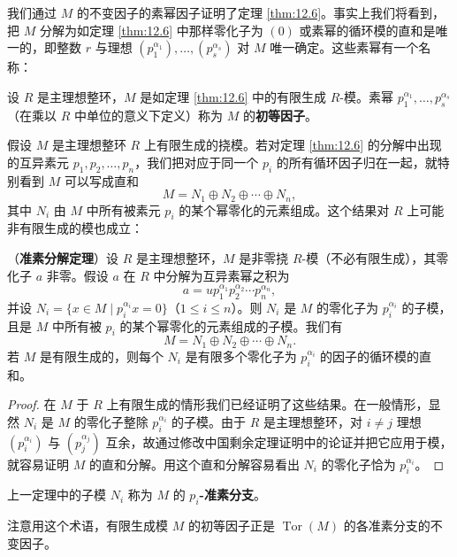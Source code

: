 我们通过 \(M\) 的不变因子的素幂因子证明了定理 \ref{thm:12.6}。事实上我们将看到，把 \(M\) 分解为如定理 \ref{thm:12.6} 中那样零化子为 \((0)\) 或素幂的循环模的直和是唯一的，即整数 \(r\) 与理想 \((p_1^{\alpha_1}), \ldots, (p_s^{\alpha_s})\) 对 \(M\) 唯一确定。这些素幂有一个名称：

\begin{definition}
设 \(R\) 是主理想整环，\(M\) 是如定理 \ref{thm:12.6} 中的有限生成 \(R\)-模。素幂 \(p_1^{\alpha_1}, \ldots, p_s^{\alpha_s}\)（在乘以 \(R\) 中单位的意义下定义）称为 \(M\) 的\textbf{初等因子}。
\end{definition}

假设 \(M\) 是主理想整环 \(R\) 上有限生成的挠模。若对定理 \ref{thm:12.6} 的分解中出现的互异素元 \(p_1, p_2, \ldots, p_n\)，我们把对应于同一个 \(p_i\) 的所有循环因子归在一起，就特别看到 \(M\) 可以写成直和
\[
M = N_1 \oplus N_2 \oplus \cdots \oplus N_n,
\]
其中 \(N_i\) 由 \(M\) 中所有被素元 \(p_i\) 的某个幂零化的元素组成。这个结果对 \(R\) 上可能非有限生成的模也成立：

\begin{theorem}\label{thm:12.7}
（\textbf{准素分解定理}）设 \(R\) 是主理想整环，\(M\) 是非零挠 \(R\)-模（不必有限生成），其零化子 \(a\) 非零。假设 \(a\) 在 \(R\) 中分解为互异素幂之积为
\[
a = up_1^{\alpha_1}p_2^{\alpha_2}\cdots p_n^{\alpha_n},
\]
并设 \(N_i = \{x \in M \mid p_i^{\alpha_i}x = 0\}\)（\(1 \leq i \leq n\)）。则 \(N_i\) 是 \(M\) 的零化子为 \(p_i^{\alpha_i}\) 的子模，且是 \(M\) 中所有被 \(p_i\) 的某个幂零化的元素组成的子模。我们有
\[
M = N_1 \oplus N_2 \oplus \cdots \oplus N_n.
\]
若 \(M\) 是有限生成的，则每个 \(N_i\) 是有限多个零化子为 \(p_i^{\alpha_i}\) 的因子的循环模的直和。
\end{theorem}

\begin{proof}
在 \(M\) 于 \(R\) 上有限生成的情形我们已经证明了这些结果。在一般情形，显然 \(N_i\) 是 \(M\) 的零化子整除 \(p_i^{\alpha_i}\) 的子模。由于 \(R\) 是主理想整环，对 \(i \neq j\) 理想 \((p_i^{\alpha_i})\) 与 \((p_j^{\alpha_j})\) 互余，故通过修改中国剩余定理证明中的论证并把它应用于模，就容易证明 \(M\) 的直和分解。用这个直和分解容易看出 \(N_i\) 的零化子恰为 \(p_i^{\alpha_i}\)。
\end{proof}

\begin{definition}
上一定理中的子模 \(N_i\) 称为 \(M\) 的 \textbf{\(p_i\)-准素分支}。
\end{definition}

注意用这个术语，有限生成模 \(M\) 的初等因子正是 \(\operatorname{Tor}(M)\) 的各准素分支的不变因子。

